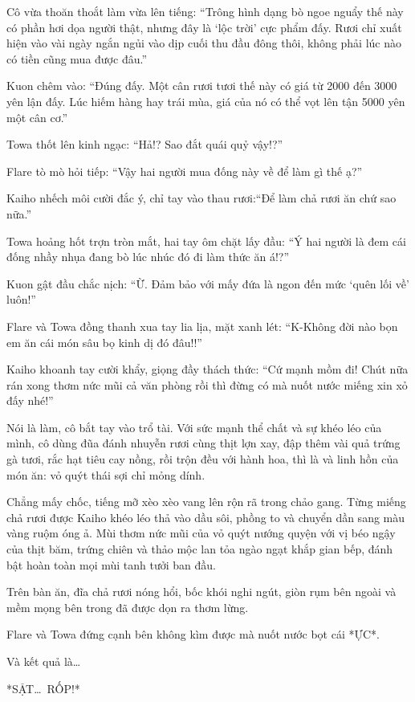 \documentclass[../main.tex]{subfiles}
\begin{document}
Cô vừa thoăn thoắt làm vừa lên tiếng: ``Trông hình dạng bò ngoe nguẩy thế này có phần hơi dọa người thật, nhưng đây là `lộc trời' cực phẩm đấy. Rươi chỉ xuất hiện vào vài ngày ngắn ngủi vào dịp cuối thu đầu đông thôi, không phải lúc nào có tiền cũng mua được đâu.''

Kuon chêm vào: ``Đúng đấy. Một cân rươi tươi thế này có giá từ 2000 đến 3000 yên lận đấy. Lúc hiếm hàng hay trái mùa, giá của nó có thể vọt lên tận 5000 yên một cân cơ.''

Towa thốt lên kinh ngạc: ``Hả!? Sao đắt quái quỷ vậy!?''

Flare tò mò hỏi tiếp: ``Vậy hai người mua đống này về để làm gì thế ạ?''

Kaiho nhếch môi cười đắc ý, chỉ tay vào thau rươi:``Để làm chả rươi ăn chứ sao nữa.''

Towa hoảng hốt trợn tròn mắt, hai tay ôm chặt lấy đầu: ``Ý hai người là đem cái đống nhầy nhụa đang bò lúc nhúc đó đi làm thức ăn á!?''

Kuon gật đầu chắc nịch: ``Ừ. Đảm bảo với mấy đứa là ngon đến mức `quên lối về' luôn!''

Flare và Towa đồng thanh xua tay lia lịa, mặt xanh lét: ``K-Không đời nào bọn em ăn cái món sâu bọ kinh dị đó đâu!!''

Kaiho khoanh tay cười khẩy, giọng đầy thách thức: ``Cứ mạnh mồm đi! Chút nữa rán xong thơm nức mũi cả văn phòng rồi thì đừng có mà nuốt nước miếng xin xỏ đấy nhé!''

Nói là làm, cô bắt tay vào trổ tài. Với sức mạnh thể chất và sự khéo léo của mình, cô dùng đũa đánh nhuyễn rươi cùng thịt lợn xay, đập thêm vài quả trứng gà tươi, rắc hạt tiêu cay nồng, rồi trộn đều với hành hoa, thì là và linh hồn của món ăn: vỏ quýt thái sợi chỉ mỏng dính.

Chẳng mấy chốc, tiếng mỡ xèo xèo vang lên rộn rã trong chảo gang. Từng miếng chả rươi được Kaiho khéo léo thả vào dầu sôi, phồng to và chuyển dần sang màu vàng ruộm óng ả. Mùi thơm nức mũi của vỏ quýt nướng quyện với vị béo ngậy của thịt băm, trứng chiên và thảo mộc lan tỏa ngào ngạt khắp gian bếp, đánh bật hoàn toàn mọi mùi tanh tưởi ban đầu.

Trên bàn ăn, đĩa chả rươi nóng hổi, bốc khói nghi ngút, giòn rụm bên ngoài và mềm mọng bên trong đã được dọn ra thơm lừng.

Flare và Towa đứng cạnh bên không kìm được mà nuốt nước bọt cái *ỰC*.

Và kết quả là\dots

*SẬT\dots\ RỐP!*
\end{document}
